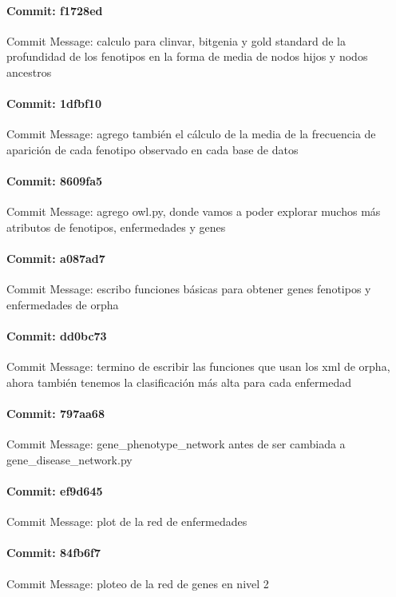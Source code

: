 \documentclass{article}
\begin{document}
\paragraph{Commit: f1728ed}
Commit Message: calculo para clinvar, bitgenia y gold standard de la profundidad de los fenotipos en la forma de media de nodos hijos y nodos ancestros

\paragraph{Commit: 1dfbf10}
Commit Message: agrego también el cálculo de la media de la frecuencia de aparición de cada fenotipo observado en cada base de datos

\paragraph{Commit: 8609fa5}
Commit Message: agrego owl.py, donde vamos a poder explorar muchos más atributos de fenotipos, enfermedades y genes

\paragraph{Commit: a087ad7}
Commit Message: escribo funciones básicas para obtener genes fenotipos y enfermedades de orpha

\paragraph{Commit: dd0bc73}
Commit Message: termino de escribir las funciones que usan los xml de orpha, ahora también tenemos la clasificación más alta para cada enfermedad

\paragraph{Commit: 797aa68}
Commit Message: gene_phenotype_network antes de ser cambiada a gene_disease_network.py

\paragraph{Commit: ef9d645}
Commit Message: plot de la red de enfermedades

\paragraph{Commit: 84fb6f7}
Commit Message: ploteo de la red de genes en nivel 2
\end{document}
